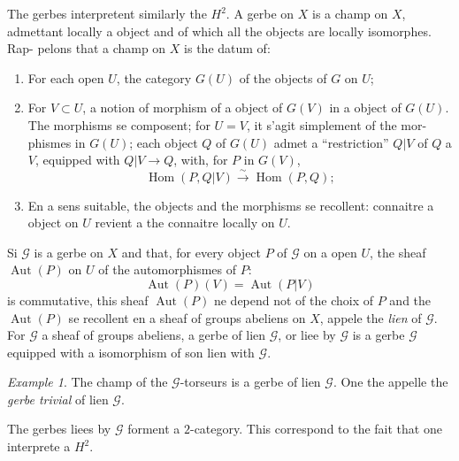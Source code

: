 \documentclass[12pt,a4paper]{article}
\theoremstyle{plain}
\theoremstyle{definition}
\theoremstyle{remark}
\newtheorem{example}[theorem]{Example}
\DeclareMathOperator{\Hom}{Hom}
\DeclareMathOperator{\Aut}{Aut}
\providecommand{\Hom}{\operatorname{Hom}}
\providecommand{\Aut}{\operatorname{Aut}}
\begin{document}
The gerbes interpretent similarly the $H^2$. A gerbe on $X$ is a champ on $X$,
admettant locally a object and of which all the objects are locally isomorphes. Rap-
pelons that a champ on $X$ is the datum of:
\begin{enumerate}[label=(C\arabic*)]
\item For each open $U$, the category $G(U)$ of the objects of $G$ on $U$;
\item For $V \subset U$, a notion of morphism of a object of $G(V)$ in a object
of $G(U)$. The morphisms se composent; for $U = V$, it s'agit simplement of the mor-
phismes in $G(U)$; each object $Q$ of $G(U)$ admet a ``restriction'' $Q|V$ of $Q$ a $V$,
equipped with $Q|V \to Q$, with, for $P$ in $G(V)$,
\[
\Hom(P, Q|V) \xrightarrow{\sim} \Hom(P, Q);
\]
\item En a sens suitable, the objects and the morphisms se recollent: connaitre
a object on $U$ revient a the connaitre locally on $U$.
\end{enumerate}

Si $\mathscr{G}$ is a gerbe on $X$ and that, for every object $P$ of $\mathscr{G}$ on a open $U$, the
sheaf $\Aut(P)$ on $U$ of the automorphismes of $P$:
\[
\Aut(P)(V) = \Aut(P|V)
\]
is commutative, this sheaf $\Aut(P)$ ne depend not of the choix of $P$ and the $\Aut(P)$ se recollent
en a sheaf of groups abeliens on $X$, appele the \emph{lien} of $\mathscr{G}$. For $\mathscr{G}$ a sheaf of
groups abeliens, a gerbe of lien $\mathscr{G}$, or liee by $\mathscr{G}$ is a gerbe $\mathscr{G}$ equipped with a isomorphism of son lien with $\mathscr{G}$.

\begin{example}
The champ of the $\mathscr{G}$-torseurs is a gerbe of lien $\mathscr{G}$. One the appelle the
\emph{gerbe trivial} of lien $\mathscr{G}$.
\end{example}

\begin{miseengarde}
The gerbes liees by $\mathscr{G}$ forment a $2$-category. This correspond
to the fait that one interprete a $H^2$.
\end{miseengarde}
\end{document}
